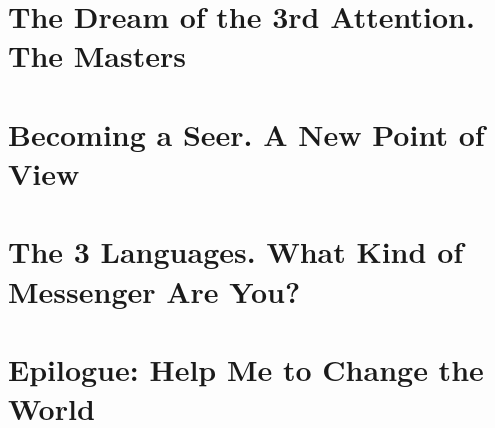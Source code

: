 \documentclass{article}
\numberwithin{equation}{section}
\begin{document}

\section{The Dream of the 3rd Attention. The Masters}


\section{Becoming a Seer. A New Point of View}


\section{The 3 Languages. What Kind of Messenger Are You?}


\section{Epilogue: Help Me to Change the World}


\printbibliography[heading=bibintoc]
	
\end{document}
